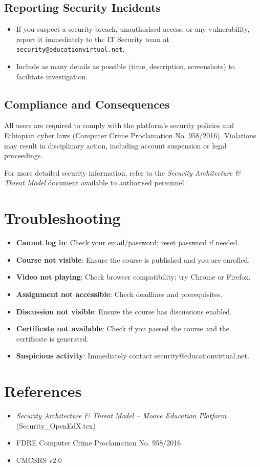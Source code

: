 \subsection{Reporting Security Incidents}
\begin{itemize}
    \item If you suspect a security breach, unauthorised access, or any vulnerability, report it immediately to the IT Security team at \texttt{security@educationvirtual.net}.
    \item Include as many details as possible (time, description, screenshots) to facilitate investigation.
\end{itemize}

\subsection{Compliance and Consequences}
All users are required to comply with the platform’s security policies and Ethiopian cyber laws (Computer Crime Proclamation No. 958/2016). Violations may result in disciplinary action, including account suspension or legal proceedings.

For more detailed security information, refer to the \textit{Security Architecture \& Threat Model} document available to authorised personnel.

\section{Troubleshooting}
\begin{itemize}
    \item \textbf{Cannot log in}: Check your email/password; reset password if needed.
    \item \textbf{Course not visible}: Ensure the course is published and you are enrolled.
    \item \textbf{Video not playing}: Check browser compatibility; try Chrome or Firefox.
    \item \textbf{Assignment not accessible}: Check deadlines and prerequisites.
    \item \textbf{Discussion not visible}: Ensure the course has discussions enabled.
    \item \textbf{Certificate not available}: Check if you passed the course and the certificate is generated.
    \item \textbf{Suspicious activity}: Immediately contact security@educationvirtual.net.
\end{itemize}

\section{References}
\begin{itemize}
    \item \textit{Security Architecture \& Threat Model – Moove Education Platform} (Security\_OpenEdX.tex)
    \item FDRE Computer Crime Proclamation No. 958/2016
    \item CMCSRS v2.0
\end{itemize}


